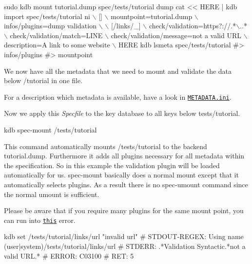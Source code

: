 \begin{DoxyCode}
sudo kdb mount tutorial.dump spec/tests/tutorial dump
cat << HERE | kdb import spec/tests/tutorial ni  \(\backslash\)
[]                                         \(\backslash\)
 mountpoint=tutorial.dump                \(\backslash\)
 infos/plugins=dump validation           \(\backslash\)
                                           \(\backslash\)
[/links/\_]                                 \(\backslash\)
check/validation=https?://.*\(\backslash\)..*         \(\backslash\)
check/validation/match=LINE              \(\backslash\)
check/validation/message=not a valid URL \(\backslash\)
description=A link to some website       \(\backslash\)
HERE
kdb lsmeta spec/tests/tutorial
#> infos/plugins
#> mountpoint
\end{DoxyCode}


We now have all the metadata that we need to mount and validate the data below {\ttfamily /tutorial} in one file.

For a description which metadata is available, have a look in \href{/home/markus/Projekte/Elektra/current/doc/METADATA.ini}{\tt M\+E\+T\+A\+D\+A\+T\+A.\+ini}.

Now we apply this {\itshape Specfile} to the key database to all keys below {\ttfamily tests/tutorial}.


\begin{DoxyCode}
kdb spec-mount /tests/tutorial
\end{DoxyCode}


This command automatically mounts {\ttfamily /tests/tutorial} to the backend {\ttfamily tutorial.\+dump}. Furthermore it adds all plugins necessary for all metadata within the specification. So in this example the validation plugin will be loaded automatically for us. {\ttfamily spec-\/mount} basically does a normal mount except that it automatically selects plugins. As a result there is no {\ttfamily spec-\/umount} command since the normal {\ttfamily umount} is sufficient.

Please be aware that if you require many plugins for the same mount point, you can run into \href{https://github.com/ElektraInitiative/libelektra/issues/2133}{\tt this} error.


\begin{DoxyCode}
kdb set /tests/tutorial/links/url "invalid url"
# STDOUT-REGEX: Using name (user|system)/tests/tutorial/links/url
# STDERR: .*Validation Syntactic.*not a valid URL.*
# ERROR:  C03100
# RET:    5
\end{DoxyCode}


